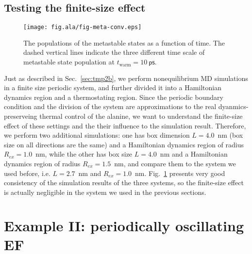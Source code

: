 \documentclass[a4paper,preprint,unsortedaddress,onecolumn]{revtex4-1}
\begin{document}
\subsection{Testing the finite-size effect}

\begin{figure}
  \centering
  \texttt{[image: fig.ala/fig-meta-conv.eps]}
  \caption{The populations of the metastable states as a function of time.
    The dashed vertical lines indicate the three different time scale of
  metastable state population at $t_{\textrm{warm}} = 10~\textsf{ps}$.}
  \label{fig:tmp7}
\end{figure}

Just as described in Sec.~\ref{sec:tmp2b}, we perform nonequilibrium MD
simulations in a finite size periodic system, and further divided it
into a Hamiltonian dynamics region and a thermostating region.
Since the periodic boundary condition and the division of the system
are approximations to the real dyanmics-preserveing thermal control of the alanine, 
we want to understand the finite-size effect of
these settings and the their influence to the simulation result.
Therefore, we
perform two additional simulations: one has box dimension $L=4.0$~nm (box size on all directions are the same) and a
Hamiltonian dynamics region of radius $R_{ex} = 1.0$~nm, while the
other has box size $L=4.0$~nm and a Hamiltonian dynamics region of
radius $R_{ex} = 1.5$~nm, and compare them to the system
we used before, i.e. $L=2.7$~nm and $R_{ex} = 1.0$~nm.
Fig.~\ref{fig:tmp7} presents very good consistency of
the simulation results of the three systems, so the finite-size effect is
actually negligible in the system we used in the previous sections.



\section{Example II:
  periodically oscillating EF}
\end{document}
